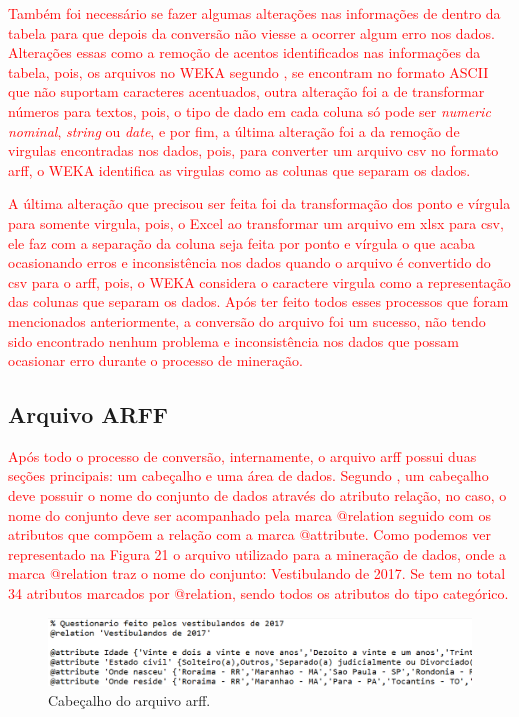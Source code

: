 \par
\textcolor{red}{Também foi necessário se fazer algumas alterações nas informações de dentro da tabela para que depois da conversão não viesse a ocorrer algum erro nos dados. Alterações essas como a remoção de acentos identificados nas informações da tabela, pois, os arquivos no WEKA segundo , se encontram no formato ASCII que não suportam caracteres acentuados, outra alteração foi a de transformar números para textos, pois, o tipo de dado em cada coluna só pode ser \textit{numeric nominal}, \textit{string} ou \textit{date}, e por fim, a última alteração foi a da remoção de virgulas encontradas nos dados, pois, para converter um arquivo csv no formato arff, o WEKA identifica as virgulas como as colunas que separam os dados.}

\par
\textcolor{red}{A última alteração que precisou ser feita foi da transformação dos ponto e vírgula para somente virgula, pois, o Excel ao transformar um arquivo em xlsx para csv, ele faz com a separação da coluna seja feita por ponto e vírgula o que acaba ocasionando erros e inconsistência nos dados quando o arquivo é convertido do csv para o arff, pois, o WEKA considera o caractere virgula como a representação das colunas que separam os dados. Após ter feito todos esses processos que foram mencionados anteriormente, a conversão do arquivo foi um sucesso, não tendo sido encontrado nenhum problema e inconsistência nos dados que possam ocasionar erro durante o processo de mineração.}


\subsection{Arquivo ARFF}

\par
\textcolor{red}{Após todo o processo de conversão, internamente, o arquivo arff possui duas seções principais: um cabeçalho e uma área de dados. Segundo , um cabeçalho deve possuir o nome do conjunto de dados através do atributo relação, no caso, o nome do conjunto deve ser acompanhado pela marca @relation seguido com os atributos que compõem a relação com a marca @attribute. Como podemos ver representado na Figura 21 o arquivo utilizado para a mineração de dados, onde a marca @relation traz o nome do conjunto: Vestibulando de 2017. Se tem no total 34 atributos marcados por @relation, sendo todos os atributos do tipo categórico.} 

\par
\begin{figure}[!htp]
	\begin{center}
    \caption{\label{fig:waveform_fig} Cabeçalho do arquivo arff.}
	\includegraphics[scale=0.57]{Figuras/arquivo_arff.png}
	\end{center}
\end{figure}

